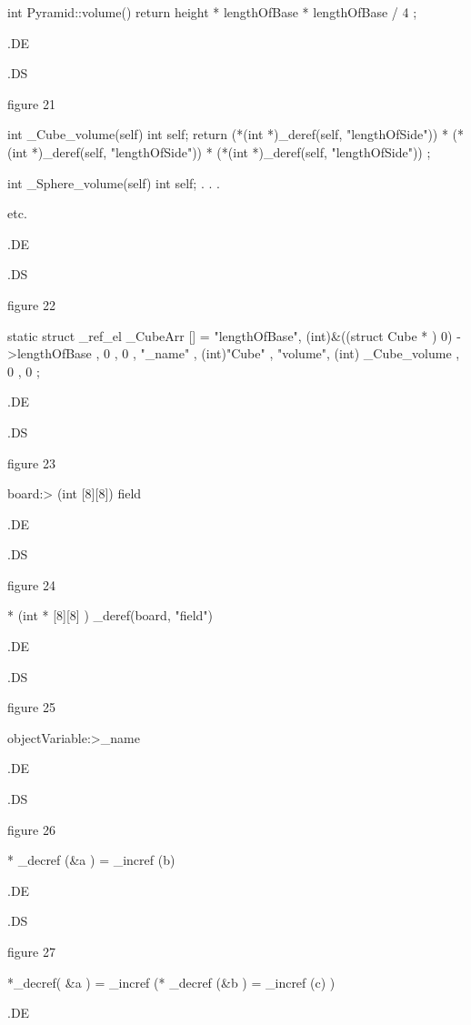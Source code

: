 int Pyramid::volume()
{ return height * lengthOfBase * lengthOfBase / 4 ; }


.DE






.DS

figure 21


int _Cube_volume(self)  int self;
{ return (*(int  *)_deref(self, "lengthOfSide")) *
         (*(int  *)_deref(self, "lengthOfSide")) *
         (*(int  *)_deref(self, "lengthOfSide")) ;
}

int _Sphere_volume(self)	int self;
{
	.
	.
	.
}

etc.


.DE







.DS

figure 22

static struct _ref_el _CubeArr [] =
    { 
	{ "lengthOfBase", (int)&((struct Cube * ) 0) ->lengthOfBase },
	{ 0 , 0 },
	{ "_name" , (int)"Cube" },
	{ "volume",	(int) _Cube_volume },
	{  0 , 0 }
    };	


.DE





.DS

figure 23

board:> (int [8][8]) field

.DE






.DS

figure 24

* (int * [8][8] ) _deref(board, "field")


.DE






.DS

figure 25

objectVariable:>_name


.DE





.DS

figure 26

* _decref (&a ) = _incref (b)


.DE






.DS

figure 27

*_decref( &a ) = _incref (* _decref (&b ) = _incref (c) )


.DE


